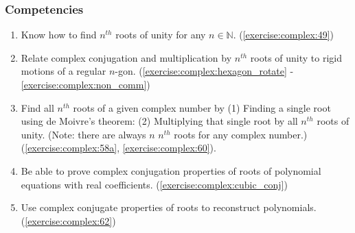 \subsubsection*{Competencies}
\begin{enumerate}
\item
Know how to find $n^{th}$ roots of unity for any $n \in \mathbb{N}$. (\ref{exercise:complex:49})
\item
Relate complex conjugation and multiplication by $n^{th}$ roots of unity to rigid motions of a regular $n$-gon. (\ref{exercise:complex:hexagon_rotate} - \ref{exercise:complex:non_comm})
\item
Find all $n^{th}$ roots of a given complex number by (1) Finding a single root using de Moivre's theorem: (2) Multiplying that single root by all $n^{th}$ roots of unity. (Note: there are always $n$ $n^{th}$ roots for any complex number.) (\ref{exercise:complex:58a}, \ref{exercise:complex:60}).
\item
Be able to prove complex conjugation properties of roots of polynomial equations with real coefficients. (\ref{exercise:complex:cubic_conj})
\item
Use complex conjugate properties of roots to reconstruct polynomials. (\ref{exercise:complex:62})
\end{enumerate}








